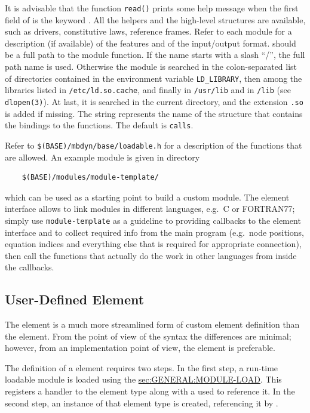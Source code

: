 It is advisable that the function \texttt{read()} prints some help message
when the first field of  is the keyword .
All the helpers and the high-level structures are available, such as
drivers, constitutive laws, reference frames.
Refer to each module for a description (if available) of the features and of
the input/output format.
 should be a full path to the module function.
If the name starts with a slash ``/'', the full path name is used.
Otherwise the module is searched in the colon-separated list of directories 
contained in the environment variable \texttt{LD\_LIBRARY}, then among the
libraries listed in \texttt{/etc/ld.so.cache}, and finally in
\texttt{/usr/lib} and in \texttt{/lib} (see \texttt{dlopen(3)}).
At last, it is searched in the current directory, and the extension
\texttt{.so} is added if missing.
The string  represents the name of the structure that contains
the bindings to the functions.
The default is \texttt{calls}.

\noindent
Refer to \texttt{\$(BASE)/mbdyn/base/loadable.h} for a description of the
functions that are allowed.
An example module is given in directory
\begin{verbatim}
    $(BASE)/modules/module-template/
\end{verbatim}
which can be used as a starting point to build a custom module.
The  element interface allows to link modules in different
languages, e.g.\ C or FORTRAN77; simply use \texttt{module-template}
as a guideline to providing callbacks to the  element
interface and to collect required info from the main program
(e.g.\ node positions, equation indices and everything else that is
required for appropriate connection), then call the functions that
actually do the work in other languages from inside the callbacks.

\subsection{User-Defined Element}
The  element is a much more streamlined form
of custom element definition than the  element.
From the point of view of the syntax the differences are minimal;
however, from an implementation point of view, the 
element is preferable.

The definition of a  element requires two steps.
In the first step, a run-time loadable module is loaded using the 
\hyperref{\kw{module load} directive}{\kw{module load} directive (see Section~}{)}{sec:GENERAL:MODULE-LOAD}.
This registers a handler to the  element type
along with a  used to reference it.
In the second step, an instance of that  element type
is created, referencing it by .

